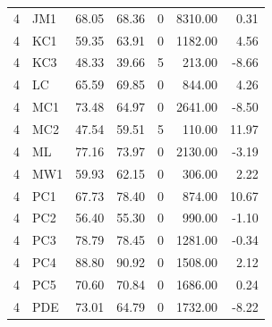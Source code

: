 \begin{table}
\begin{tabular}{rlrrrrr}
4 & JM1 & 68.05 & 68.36 & 0 & 8310.00 & 0.31 \\
4 & KC1 & 59.35 & 63.91 & 0 & 1182.00 & 4.56 \\
4 & KC3 & 48.33 & 39.66 & 5 & 213.00 & -8.66 \\
4 & LC & 65.59 & 69.85 & 0 & 844.00 & 4.26 \\
4 & MC1 & 73.48 & 64.97 & 0 & 2641.00 & -8.50 \\
4 & MC2 & 47.54 & 59.51 & 5 & 110.00 & 11.97 \\
4 & ML & 77.16 & 73.97 & 0 & 2130.00 & -3.19 \\
4 & MW1 & 59.93 & 62.15 & 0 & 306.00 & 2.22 \\
4 & PC1 & 67.73 & 78.40 & 0 & 874.00 & 10.67 \\
4 & PC2 & 56.40 & 55.30 & 0 & 990.00 & -1.10 \\
4 & PC3 & 78.79 & 78.45 & 0 & 1281.00 & -0.34 \\
4 & PC4 & 88.80 & 90.92 & 0 & 1508.00 & 2.12 \\
4 & PC5 & 70.60 & 70.84 & 0 & 1686.00 & 0.24 \\
4 & PDE & 73.01 & 64.79 & 0 & 1732.00 & -8.22 \\
\bottomrule
\end{tabular}
\end{table}
